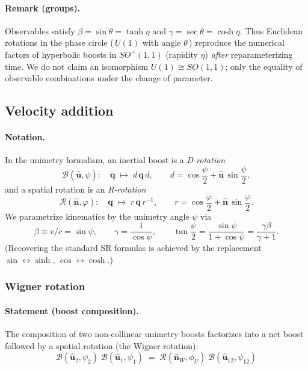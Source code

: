\documentclass[11pt]{article}
\numberwithin{equation}{section}
\begin{document}
\paragraph{Remark (groups).} Observables satisfy $\beta=\sin\theta=\tanh\eta$ and $\gamma=\sec\theta=\cosh\eta$. Thus Euclidean rotations in the phase circle (\,$U(1)$ with angle $\theta$\,) reproduce the numerical factors of hyperbolic boosts in $SO^+(1,1)$ (rapidity $\eta$) \emph{after} reparameterizing time. We do not claim an isomorphism $U(1)\cong SO(1,1)$; only the equality of observable combinations under the change of parameter.


\subsection{Velocity addition}
\label{sec:vel-addition}

\paragraph{Notation.}
In the unimetry formalism, an inertial boost is a \emph{D-rotation}
\begin{equation}
\mathcal{B}(\hat{\mathbf u},\psi):\quad \mathbf q \;\mapsto\; d\,\mathbf q\,d,
\qquad
d=\cos\frac{\psi}{2}+\hat{\mathbf u}\,\sin\frac{\psi}{2},
\label{eq:uni-boost}
\end{equation}
and a spatial rotation is an \emph{R-rotation}
\begin{equation}
\mathcal{R}(\hat{\mathbf n},\varphi):\quad \mathbf q \;\mapsto\; r\,\mathbf q\,r^{-1},
\qquad
r=\cos\frac{\varphi}{2}+\hat{\mathbf n}\,\sin\frac{\varphi}{2}.
\label{eq:uni-rot}
\end{equation}
We parametrize kinematics by the unimetry angle $\psi$ via
\begin{equation}
\beta\equiv v/c=\sin\psi,\qquad \gamma=\frac{1}{\cos\psi},\qquad
\tan\frac{\psi}{2}=\frac{\sin\psi}{1+\cos\psi}=\frac{\gamma\beta}{\gamma+1}.
\label{eq:psi-mapping}
\end{equation}
(Recovering the standard SR formulas is achieved by the replacement
$\sin\!\leftrightarrow\sinh$, $\cos\!\leftrightarrow\cosh$.)

\subsubsection{Wigner rotation}
\label{subsec:wigner}

\paragraph{Statement (boost composition).}
The composition of two non-collinear unimetry boosts factorizes into a net boost
followed by a spatial rotation (the Wigner rotation):
\begin{equation}
\boxed{\;
\mathcal{B}(\hat{\mathbf u}_2,\psi_2)\;\mathcal{B}(\hat{\mathbf u}_1,\psi_1)
\;=\;
\mathcal{R}(\hat{\mathbf n}_W,\phi_U)\;\mathcal{B}(\hat{\mathbf u}_{12},\psi_{12})
\;}
\label{eq:wigner-factorization}
\end{equation}
\end{document}
